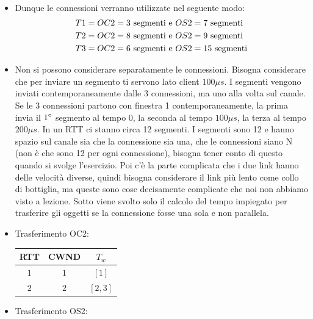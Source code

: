 \documentclass[10pt]{article}
\newcommand{\lightrule}{%
	\arrayrulecolor{black!30}%
	\midrule[\lightrulewidth]%
	\arrayrulecolor{black}}
\begin{document}
\begin{enumerate}
\begin{equation}
\begin{split}
			\end{split}
			\end{equation}
			\begin{itemize}
			\item Dunque le connessioni verranno utilizzate nel seguente modo:
			\begin{equation}
				\notag
				\begin{split}
				T1 & = OC2 = 3 \textrm{ segmenti e } OS2 = 7 \textrm{ segmenti} \\
				T2 & = OC2 = 8 \textrm{ segmenti e } OS2 = 9 \textrm{ segmenti} \\
				T3 & = OC2 = 6 \textrm{ segmenti e } OS2 = 15 \textrm{ segmenti} \\
				\end{split}
			\end{equation}
			\item Non si possono considerare separatamente le connessioni. Bisogna considerare che per inviare un segmento ti servono lato client $100 \mu s$. I segmenti vengono inviati contemporaneamente dalle 3 connessioni, ma uno alla volta sul canale. Se le 3 connessioni partono con finestra 1 contemporaneamente, la prima invia il $1 \degree$ segmento al tempo 0, la seconda al tempo $100 \mu s$, la terza al tempo $200 \mu s$. In un RTT ci stanno circa 12 segmenti. I segmenti sono 12 e hanno spazio sul canale sia che la connessione sia una, che le connessioni siano N (non è che sono 12 per ogni connessione), bisogna tener conto di questo quando si svolge l'esercizio. Poi c'è la parte complicata che i due link hanno delle velocità diverse, quindi bisogna considerare il link più lento come collo di bottiglia, ma queste sono cose decisamente complicate che noi non abbiamo visto a lezione.
			Sotto viene svolto solo il calcolo del tempo impiegato per trasferire gli oggetti se la connessione fosse una sola e non parallela.
			\newpage
			\item Trasferimento OC2:
			\begin{center}
				\centering
 				\begin{tabular}{@{} *{3}{c} @{}}
 				\toprule
 					\textbf{RTT} & \textbf{CWND} & \textbf{$T_w$} \\
 				\midrule
 					$1$ & $1$ & $[1]$ \\ 
				\lightrule
 					$2$ & $2$ & $[2,3]$ \\
				\bottomrule
				\end{tabular}
			\end{center}
			\item Trasferimento OS2:

\end{itemize}
\end{enumerate}
\end{document}

